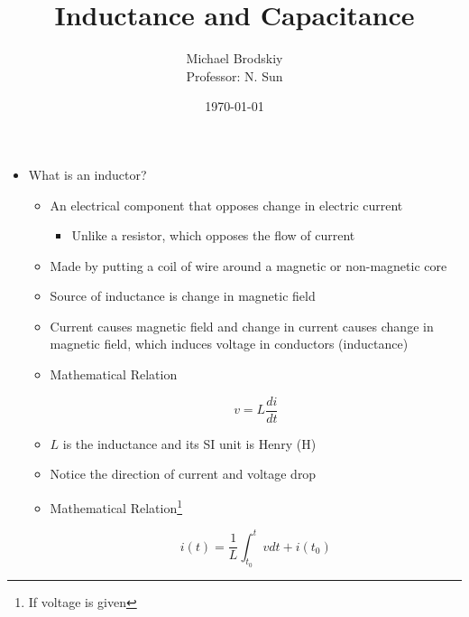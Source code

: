 


\title{Inductance and Capacitance}
\date{\today}
\author{Michael Brodskiy\\ \small Professor: N. Sun}



\maketitle

\begin{itemize}

  \item What is an inductor?

    \begin{itemize}

      \item An electrical component that opposes change in electric current

        \begin{itemize}

          \item Unlike a resistor, which opposes the flow of current

        \end{itemize}

      \item Made by putting a coil of wire around a magnetic or non-magnetic core

      \item Source of inductance is change in magnetic field

      \item Current causes magnetic field and change in current causes change in magnetic field, which induces voltage in conductors (inductance)

      \item Mathematical Relation

        $$\boxed{v=L\frac{di}{dt}}$$

      \item $L$ is the inductance and its SI unit is Henry ($\si{\henry}$)

      \item Notice the direction of current and voltage drop

      \item Mathematical Relation\footnote{If voltage is given}

        $$i(t)=\frac{1}{L}\int_{t_0}^t vdt+i(t_0)$$

    \end{itemize}

\end{itemize}



